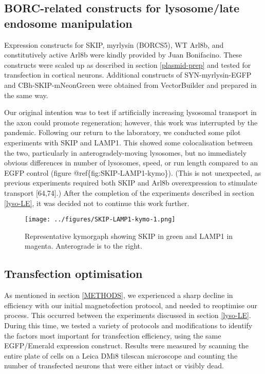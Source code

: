 \documentclass[
  12pt,
  a4paper,
]{book}
\begin{document}
\hypertarget{borc-related-constructs-for-lysosomelate-endosome-manipulation}{%
\subsection{BORC-related constructs for lysosome/late endosome manipulation}\label{borc-related-constructs-for-lysosomelate-endosome-manipulation}}

Expression constructs for SKIP, myrlysin (BORCS5), WT Arl8b, and constitutively active Arl8b were kindly provided by Juan Bonifacino. These constructs were scaled up as described in section \ref{plasmid-prep} and tested for transfection in cortical neurons. Additional constructs of SYN-myrlysin-EGFP and CBh-SKIP-mNeonGreen were obtained from VectorBuilder and prepared in the same way.

Our original intention was to test if artificially increasing lysosomal transport in the axon could promote regeneration; however, this work was interrupted by the pandemic. Following our return to the laboratory, we conducted some pilot experiments with SKIP and LAMP1. This showed some colocalisation between the two, particularly in anterogradely-moving lysosomes, but no immediately obvious differences in number of lysosomes, speed, or run length compared to an EGFP control (figure @ref\{fig:SKIP-LAMP1-kymo\}). (This is not unexpected, as previous experiments required both SKIP and Arl8b overexpression to stimulate transport {[}64,74{]}.) After the completion of the experiments described in section \ref{lyso-LE}, it was decided not to continue this work further.

\begin{figure}
\centering
\texttt{[image: ../figures/SKIP-LAMP1-kymo-1.png]}
\caption{\label{fig:SKIP-LAMP1-kymo}Representative kymorgaph showing SKIP in green and LAMP1 in magenta. Anterograde is to the right.}
\end{figure}

\hypertarget{transfection-optimisation}{%
\subsection{Transfection optimisation}\label{transfection-optimisation}}

As mentioned in section \ref{METHODS}, we experienced a sharp decline in efficiency with our initial magnetofection protocol, and needed to reoptimise our process. This occurred between the experiments discussed in section \ref{lyso-LE}. During this time, we tested a variety of protocols and modifications to identify the factors most important for transfection efficiency, using the same EGFP/Emerald expression construct. Results were measured by scanning the entire plate of cells on a Leica DMi8 tilescan microscope and counting the number of transfected neurons that were either intact or visibly dead.
\end{document}
